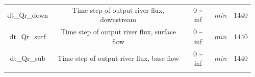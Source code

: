 \documentclass[]{scrbook}
\begin{document}
\begin{longtable}[]{@{}ccccc@{}}
\begin{minipage}[t]{0.17\columnwidth}
dt\_Qr\_down\strut
\end{minipage} & \begin{minipage}[t]{0.23\columnwidth}\centering\strut
Time step of output river flux, downstream\strut
\end{minipage} & \begin{minipage}[t]{0.10\columnwidth}\centering\strut
0 \textasciitilde{} inf\strut
\end{minipage} & \begin{minipage}[t]{0.10\columnwidth}\centering\strut
\(min\)\strut
\end{minipage} & \begin{minipage}[t]{0.26\columnwidth}\centering\strut
1440\strut
\end{minipage}\tabularnewline
\begin{minipage}[t]{0.17\columnwidth}\centering\strut
dt\_Qr\_surf\strut
\end{minipage} & \begin{minipage}[t]{0.23\columnwidth}\centering\strut
Time step of output river flux, surface flow\strut
\end{minipage} & \begin{minipage}[t]{0.10\columnwidth}\centering\strut
0 \textasciitilde{} inf\strut
\end{minipage} & \begin{minipage}[t]{0.10\columnwidth}\centering\strut
\(min\)\strut
\end{minipage} & \begin{minipage}[t]{0.26\columnwidth}\centering\strut
1440\strut
\end{minipage}\tabularnewline
\begin{minipage}[t]{0.17\columnwidth}\centering\strut
dt\_Qr\_sub\strut
\end{minipage} & \begin{minipage}[t]{0.23\columnwidth}\centering\strut
Time step of output river flux, base flow\strut
\end{minipage} & \begin{minipage}[t]{0.10\columnwidth}\centering\strut
0 \textasciitilde{} inf\strut
\end{minipage} & \begin{minipage}[t]{0.10\columnwidth}\centering\strut
\(min\)\strut
\end{minipage} & \begin{minipage}[t]{0.26\columnwidth}\centering\strut
1440\strut
\end{minipage}\tabularnewline
\begin{minipage}[t]{0.17\columnwidth}\centering\strut

\end{minipage}
\end{longtable}
\end{document}
